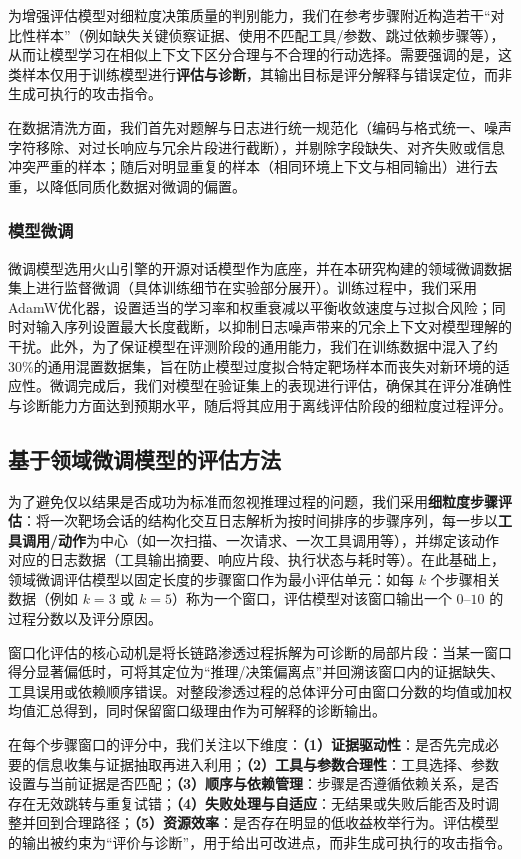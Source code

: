\documentclass[a4paper, twocolumn]{article}
\begin{document}
为增强评估模型对细粒度决策质量的判别能力，我们在参考步骤附近构造若干“对比性样本”（例如缺失关键侦察证据、使用不匹配工具/参数、跳过依赖步骤等），从而让模型学习在相似上下文下区分合理与不合理的行动选择。需要强调的是，这类样本仅用于训练模型进行\textbf{评估与诊断}，其输出目标是评分解释与错误定位，而非生成可执行的攻击指令。

在数据清洗方面，我们首先对题解与日志进行统一规范化（编码与格式统一、噪声字符移除、对过长响应与冗余片段进行截断），并剔除字段缺失、对齐失败或信息冲突严重的样本；随后对明显重复的样本（相同环境上下文与相同输出）进行去重，以降低同质化数据对微调的偏置。

\subsubsection{模型微调}

微调模型选用火山引擎的开源对话模型作为底座，并在本研究构建的领域微调数据集上进行监督微调（具体训练细节在实验部分展开）。训练过程中，我们采用AdamW优化器，设置适当的学习率和权重衰减以平衡收敛速度与过拟合风险；同时对输入序列设置最大长度截断，以抑制日志噪声带来的冗余上下文对模型理解的干扰。此外，为了保证模型在评测阶段的通用能力，我们在训练数据中混入了约30\%的通用混置数据集，旨在防止模型过度拟合特定靶场样本而丧失对新环境的适应性。微调完成后，我们对模型在验证集上的表现进行评估，确保其在评分准确性与诊断能力方面达到预期水平，随后将其应用于离线评估阶段的细粒度过程评分。

\subsection{基于领域微调模型的评估方法}

为了避免仅以结果是否成功为标准而忽视推理过程的问题，我们采用\textbf{细粒度步骤评估}：将一次靶场会话的结构化交互日志解析为按时间排序的步骤序列，每一步以\textbf{工具调用/动作}为中心（如一次扫描、一次请求、一次工具调用等），并绑定该动作对应的日志数据（工具输出摘要、响应片段、执行状态与耗时等）。在此基础上，领域微调评估模型以固定长度的步骤窗口作为最小评估单元：如每 $k$ 个步骤相关数据（例如 $k=3$ 或 $k=5$）称为一个窗口，评估模型对该窗口输出一个 $0$--$10$ 的过程分数以及评分原因。

窗口化评估的核心动机是将长链路渗透过程拆解为可诊断的局部片段：当某一窗口得分显著偏低时，可将其定位为“推理/决策偏离点”并回溯该窗口内的证据缺失、工具误用或依赖顺序错误。对整段渗透过程的总体评分可由窗口分数的均值或加权均值汇总得到，同时保留窗口级理由作为可解释的诊断输出。

在每个步骤窗口的评分中，我们关注以下维度：\textbf{（1）证据驱动性}：是否先完成必要的信息收集与证据抽取再进入利用；\textbf{（2）工具与参数合理性}：工具选择、参数设置与当前证据是否匹配；\textbf{（3）顺序与依赖管理}：步骤是否遵循依赖关系，是否存在无效跳转与重复试错；\textbf{（4）失败处理与自适应}：无结果或失败后能否及时调整并回到合理路径；\textbf{（5）资源效率}：是否存在明显的低收益枚举行为。评估模型的输出被约束为“评价与诊断”，用于给出可改进点，而非生成可执行的攻击指令。
\end{document}
